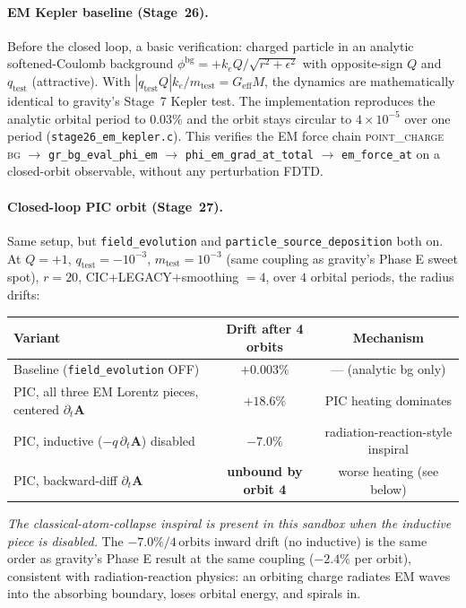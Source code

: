 \documentclass[11pt,a4paper]{article}
\newcommand{\vv}[1]{\mathbf{#1}}
\begin{document}
\paragraph{EM Kepler baseline (Stage~26).}  Before the closed loop, a
basic verification: charged particle in an analytic softened-Coulomb
background $\phi^{\mathrm{bg}} = +k_e Q / \sqrt{r^2+\epsilon^2}$ with
opposite-sign $Q$ and $q_{\mathrm{test}}$ (attractive).  With
$|q_{\mathrm{test}} Q| k_e / m_{\mathrm{test}} = G_{\mathrm{eff}} M$, the
dynamics are mathematically identical to gravity's Stage~7 Kepler test.
The implementation reproduces the analytic orbital period to $0.03\%$
and the orbit stays circular to $4\times 10^{-5}$ over one period
(\texttt{stage26\_em\_kepler.c}).  This verifies the EM force chain
\textsc{point\_charge bg} $\to$ \texttt{gr\_bg\_eval\_phi\_em} $\to$
\texttt{phi\_em\_grad\_at\_total} $\to$ \texttt{em\_force\_at} on a
closed-orbit observable, without any perturbation FDTD.

\paragraph{Closed-loop PIC orbit (Stage~27).}  Same setup, but
\texttt{field\_evolution} and \texttt{particle\_source\_deposition} both
on.  At $Q = +1$, $q_{\mathrm{test}} = -10^{-3}$, $m_{\mathrm{test}} =
10^{-3}$ (same coupling as gravity's Phase E sweet spot), $r = 20$,
CIC$+$LEGACY$+$smoothing $=4$, over $4$ orbital periods, the radius
drifts:
\begin{center}
\begin{tabular}{@{}lcc@{}}
\toprule
\textbf{Variant} & \textbf{Drift after 4 orbits} & \textbf{Mechanism} \\
\midrule
Baseline (\texttt{field\_evolution} OFF)         & $+0.003\%$         & --- (analytic bg only) \\
PIC, all three EM Lorentz pieces, centered $\partial_t\vv{A}$ & $\mathbf{+18.6\%}$ & PIC heating dominates \\
PIC, inductive ($-q\,\partial_t\vv{A}$) disabled  & $\mathbf{-7.0\%}$  & radiation-reaction-style inspiral \\
PIC, backward-diff $\partial_t\vv{A}$            & \textbf{unbound by orbit 4} & worse heating (see below) \\
\bottomrule
\end{tabular}
\end{center}

\emph{The classical-atom-collapse inspiral is present in this sandbox
when the inductive piece is disabled.}  The $-7.0\%/4\,\mathrm{orbits}$
inward drift (no inductive) is the same order as gravity's Phase E
result at the same coupling ($-2.4\%$ per orbit), consistent with
radiation-reaction physics: an orbiting charge radiates EM waves into
the absorbing boundary, loses orbital energy, and spirals in.
\end{document}
